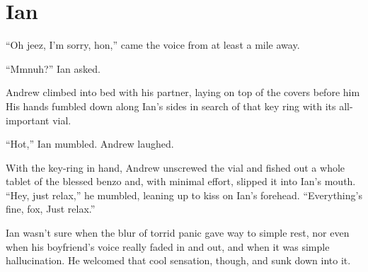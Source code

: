 \chapter{Ian}

``Oh jeez, I'm sorry, hon,'' came the voice from at least a mile away.

``Mmnuh?'' Ian asked.

Andrew climbed into bed with his partner, laying on top of the covers before him His hands fumbled down along Ian's sides in search of that key ring with its all-important vial.

``Hot,'' Ian mumbled. Andrew laughed.

With the key-ring in hand, Andrew unscrewed the vial and fished out a whole tablet of the blessed benzo and, with minimal effort, slipped it into Ian's mouth. ``Hey, just relax,'' he mumbled, leaning up to kiss on Ian's forehead. ``Everything's fine, fox, Just relax.''

Ian wasn't sure when the blur of torrid panic gave way to simple rest, nor even when his boyfriend's voice really faded in and out, and when it was simple hallucination. He welcomed that cool sensation, though, and sunk down into it.
